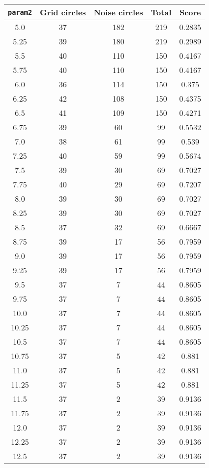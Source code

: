 \documentclass[letterpaper, 12pt]{article}
\begin{document}
\begin{longtable}{|c|c|c|c|c|}
\hline
\textbf{\texttt{param2}} & \textbf{Grid circles} & \textbf{Noise circles} & \textbf{Total} & \textbf{Score} \\
\hline
5.0 & 37 & 182 & 219 & 0.2835 \\
\hline
5.25 & 39 & 180 & 219 & 0.2989 \\
\hline
5.5 & 40 & 110 & 150 & 0.4167 \\
\hline
5.75 & 40 & 110 & 150 & 0.4167 \\
\hline
6.0 & 36 & 114 & 150 & 0.375 \\
\hline
6.25 & 42 & 108 & 150 & 0.4375 \\
\hline
6.5 & 41 & 109 & 150 & 0.4271 \\
\hline
6.75 & 39 & 60 & 99 & 0.5532 \\
\hline
7.0 & 38 & 61 & 99 & 0.539 \\
\hline
7.25 & 40 & 59 & 99 & 0.5674 \\
\hline
7.5 & 39 & 30 & 69 & 0.7027 \\
\hline
7.75 & 40 & 29 & 69 & 0.7207 \\
\hline
8.0 & 39 & 30 & 69 & 0.7027 \\
\hline
8.25 & 39 & 30 & 69 & 0.7027 \\
\hline
8.5 & 37 & 32 & 69 & 0.6667 \\
\hline
8.75 & 39 & 17 & 56 & 0.7959 \\
\hline
9.0 & 39 & 17 & 56 & 0.7959 \\
\hline
9.25 & 39 & 17 & 56 & 0.7959 \\
\hline
9.5 & 37 & 7 & 44 & 0.8605 \\
\hline
9.75 & 37 & 7 & 44 & 0.8605 \\
\hline
10.0 & 37 & 7 & 44 & 0.8605 \\
\hline
10.25 & 37 & 7 & 44 & 0.8605 \\
\hline
10.5 & 37 & 7 & 44 & 0.8605 \\
\hline
10.75 & 37 & 5 & 42 & 0.881 \\
\hline
11.0 & 37 & 5 & 42 & 0.881 \\
\hline
11.25 & 37 & 5 & 42 & 0.881 \\
\hline
11.5 & 37 & 2 & 39 & 0.9136 \\
\hline
11.75 & 37 & 2 & 39 & 0.9136 \\
\hline
12.0 & 37 & 2 & 39 & 0.9136 \\
\hline
12.25 & 37 & 2 & 39 & 0.9136 \\
\hline
12.5 & 37 & 2 & 39 & 0.9136 \\

\end{longtable}
\end{document}
